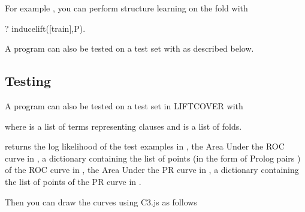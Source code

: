\documentclass[letterpaper,10pt,english]{sphinxmanual}
\begin{document}
\sphinxAtStartPar
For example , you can perform structure learning on the  fold with

\begin{sphinxVerbatim}[commandchars=\\\{\}]
?\PYGZhy{} induce\PYGZus{}lift([train],P).
\end{sphinxVerbatim}

\sphinxAtStartPar
A program can also be tested on a test set with   as described below.


\subsection{Testing}
\label{\detokenize{index:testing}}
\sphinxAtStartPar
A program can also be tested on a test set in LIFTCOVER with

\begin{sphinxVerbatim}[commandchars=\\\{\}]
  
\end{sphinxVerbatim}

\sphinxAtStartPar
where  is a list of terms representing clauses and  is a list of folds.

\sphinxAtStartPar
{} returns the log likelihood of the test examples in , the Area Under the ROC curve in , a dictionary containing the list of points (in the form of Prolog pairs ) of the ROC curve in , the Area Under the PR curve in , a dictionary containing the list of points of the PR curve in .

\sphinxAtStartPar
Then you can draw the curves using C3.js as follows
\end{document}
